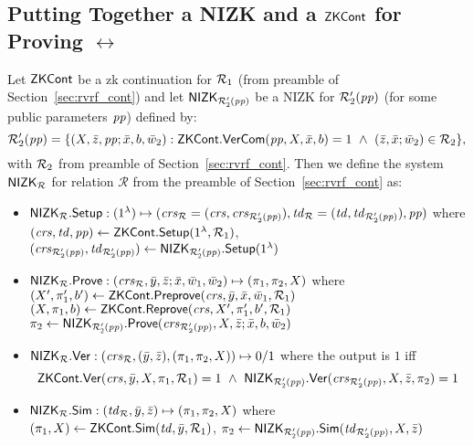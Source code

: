 \subsection{Putting Together a NIZK and a $\ZKCont$  for Proving $\rel$}
Let $\ZKCont$ be a zk continuation for $\relone$ (from preamble of Section~\ref{sec:rvrf_cont}) and 
let $\nizktwo$ be a NIZK for $\reltwo'(\pp)$ (for some public parameters $\pp$) defined by:
$$\reltwo'(\pp) = \{(X, \barz, \pp; \barx, b, \baromega_2): \ZKCont.\VerifyCom(\pp, X, \barx, b) =1 \ \wedge \ (\barz, \barx; \baromega_2) \in \reltwo \},$$
\noindent with $\reltwo$ from preamble of Section~\ref{sec:rvrf_cont}. Then we define the system $\nizkR$ for relation $\mathcal{R}$ 
from the preamble of Section~\ref{sec:rvrf_cont} as:
\begin{itemize}
\item $\nizkR.\Setup: (1^{\lambda}) \mapsto (\crsR = (\crs,\crstwo), \twR = (\tw, \twtwo), \pp)$ where
$(\crs, \tw, \pp) \leftarrow \ZKCont.\Setup(1^{\lambda}, \relone)$, \\ $(\crstwo, \twtwo) \leftarrow \nizktwo.\Setup(1^{\lambda})$


\item $\nizkR.\Prove: (\crsR,\bary, \barz; \barx, \baromega_1, \baromega_2 ) \mapsto (\pi_1, \pi_2, X)$ where \\
$(X', \pi'_1, b')\leftarrow \ZKCont.\Preprove(\crs, \bar{y}, \bar{x}, \baromega_1, \relone)$ \\
$(X, \pi_1, b) \leftarrow \ZKCont.\Reprove(\crs, X', \pi_1', b', \relone)$ \\
$ \pi_2 \leftarrow \nizktwo.\Prove(\crstwo, X, \barz; \barx, b, \baromega_2)$ 

\item $\nizkR.\Verify: (\crsR,(\bary, \barz), (\pi_1, \pi_2, X)) \mapsto 0/1$ where the output is $1$ iff 
$$\ZKCont.\Verify(\crs, \bar{y}, X, \pi_1, \relone) = 1 \  \wedge \ \nizktwo.\Verify(\crstwo, X, \barz, \pi_2) =1$$

\item $\nizkR.\Sim: (\twR, \bary, \barz) \mapsto (\pi_1, \pi_2, X)$ where \\
$(\pi_1, X) \leftarrow \ZKCont.\Sim(\tw, \bary, \relone)$, $\pi_2 \leftarrow \nizktwo.\Sim(\twtwo, X, \barz)$ 
 \end{itemize}
 
